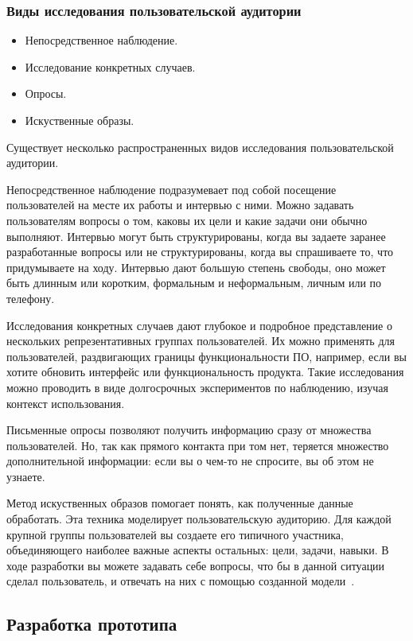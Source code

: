 \documentclass{../industrial-development}
\begin{document}
\begin{frame} \frametitle{Виды исследования пользовательской аудитории}
  \begin{itemize}
   \item Непосредственное наблюдение.
   \item Исследование конкретных случаев.
   \item Опросы.
   \item Искуственные образы.
  \end{itemize}
\end{frame}

\lecturenotes

Существует несколько распространенных видов исследования пользовательской аудитории.

Непосредственное наблюдение подразумевает под собой посещение пользователей на месте их работы и интервью с ними. Можно задавать пользователям вопросы о том, каковы их цели и какие задачи они обычно выполняют. Интервью могут быть структурированы, когда вы задаете заранее разработанные вопросы или не структурированы, когда вы спрашиваете то, что придумываете на ходу. Интервью дают большую степень свободы, оно может быть длинным или коротким, формальным и неформальным, личным или по телефону.

Исследования конкретных случаев дают глубокое и подробное представление о нескольких репрезентативных группах пользователей. Их можно применять для пользователей, раздвигающих границы функциональности ПО, например, если вы хотите обновить интерфейс или функциональность продукта. Такие исследования можно проводить в виде долгосрочных экспериментов по наблюдению, изучая контекст использования.

Письменные опросы позволяют получить информацию сразу от множества пользователей. Но, так как прямого контакта при том нет, теряется множество дополнительной информации: если вы о чем-то не спросите, вы об этом не узнаете.

Метод искуственных образов помогает понять, как полученные данные обработать. Эта техника моделирует пользовательскую аудиторию. Для каждой крупной группы пользователей вы создаете его типичного участника, объединяющего наиболее важные аспекты остальных: цели, задачи, навыки. В ходе разработки вы можете задавать себе вопросы, что бы в данной ситуации сделал пользователь, и отвечать на них с помощью созданной модели~\cite[с.~27--28]{Tidvell}.

\subsection{Разработка прототипа}
\end{document}
